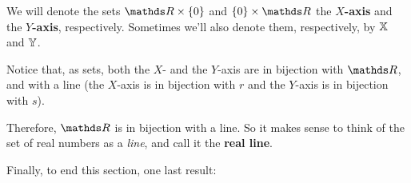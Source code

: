 \begin{df}
	We will denote the sets $\R\times\{0\}$ and $\{0\}\times \R$ the \textbf{$X$-axis} and the \textbf{$Y$-axis}, respectively. Sometimes we'll also denote them, respectively, by $\mathbb{X}$ and $\mathbb Y$.
\end{df}

\begin{rmk}
	Notice that, as sets, both the $X$- and the $Y$-axis are in bijection with $\R$, and with a line (the $X$-axis is in bijection with $r$ and the $Y$-axis is in bijection with $s$).
	
	Therefore, $\R$ is in bijection with a line. So it makes sense to think of the set of real numbers as a \textit{line}, and call it the \textbf{real line}.
\end{rmk}

Finally, to end this section, one last result:

